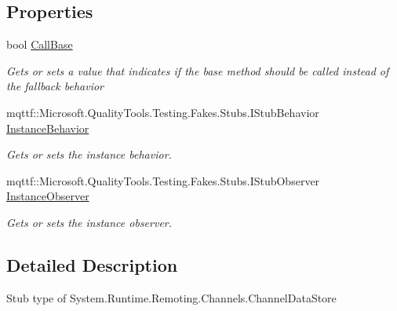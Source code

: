 \subsection*{Properties}
\begin{DoxyCompactItemize}
\item 
bool \hyperlink{class_system_1_1_runtime_1_1_remoting_1_1_channels_1_1_fakes_1_1_stub_channel_data_store_a4f0d6780231c74a5bbe0177c6b83f4ec}{Call\-Base}
\begin{DoxyCompactList}\small\item\em Gets or sets a value that indicates if the base method should be called instead of the fallback behavior\end{DoxyCompactList}\item 
mqttf\-::\-Microsoft.\-Quality\-Tools.\-Testing.\-Fakes.\-Stubs.\-I\-Stub\-Behavior \hyperlink{class_system_1_1_runtime_1_1_remoting_1_1_channels_1_1_fakes_1_1_stub_channel_data_store_acd92ed2c55f137e4af9351e3ebd0259c}{Instance\-Behavior}
\begin{DoxyCompactList}\small\item\em Gets or sets the instance behavior.\end{DoxyCompactList}\item 
mqttf\-::\-Microsoft.\-Quality\-Tools.\-Testing.\-Fakes.\-Stubs.\-I\-Stub\-Observer \hyperlink{class_system_1_1_runtime_1_1_remoting_1_1_channels_1_1_fakes_1_1_stub_channel_data_store_a918e0ceeb262cdfb4c813673a28f917b}{Instance\-Observer}
\begin{DoxyCompactList}\small\item\em Gets or sets the instance observer.\end{DoxyCompactList}\end{DoxyCompactItemize}


\subsection{Detailed Description}
Stub type of System.\-Runtime.\-Remoting.\-Channels.\-Channel\-Data\-Store



